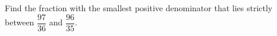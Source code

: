 Find the fraction with the smallest positive denominator that lies strictly between $\dfrac{97}{36}$ and $\dfrac{96}{35}$.

